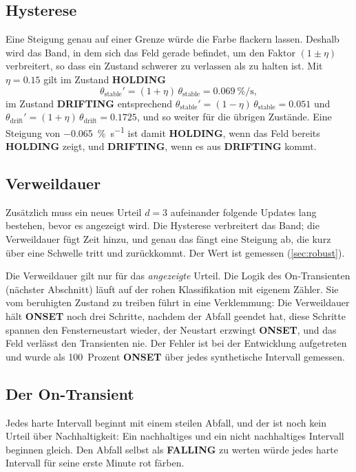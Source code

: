 \documentclass[11pt,a4paper]{article}
\newcommand{\st}[2]{\textcolor{#1}{\textbf{#2}}}
\newcommand{\HOLDING}{\st{holding}{HOLDING}}
\newcommand{\DRIFTING}{\st{drifting}{DRIFTING}}
\newcommand{\FALLING}{\st{falling}{FALLING}}
\newcommand{\ONSET}{\st{onset}{ONSET}}
\newcommand{\pers}{\si{\percent\per\second}}
\begin{document}
\subsection{Hysterese}

Eine Steigung genau auf einer Grenze würde die Farbe flackern lassen. Deshalb
wird das Band, in dem sich das Feld gerade befindet, um den Faktor
$(1 \pm \eta)$ verbreitert, so dass ein Zustand schwerer zu verlassen als zu
halten ist. Mit $\eta = \num{0.15}$ gilt im Zustand \HOLDING{}
\begin{equation}
  \theta_{\mathrm{stable}}' = (1+\eta)\,\theta_{\mathrm{stable}} = \num{0.069}~\pers,
\end{equation}
im Zustand \DRIFTING{} entsprechend
$\theta_{\mathrm{stable}}' = (1-\eta)\,\theta_{\mathrm{stable}} = \num{0.051}$
und $\theta_{\mathrm{drift}}' = (1+\eta)\,\theta_{\mathrm{drift}} = \num{0.1725}$,
und so weiter für die übrigen Zustände. Eine Steigung von
\num{-0.065}~\pers{} ist damit \HOLDING{}, wenn das Feld bereits \HOLDING{}
zeigt, und \DRIFTING{}, wenn es aus \DRIFTING{} kommt.

\subsection{Verweildauer}

Zusätzlich muss ein neues Urteil $d = 3$ aufeinander folgende Updates lang
bestehen, bevor es angezeigt wird. Die Hysterese verbreitert das Band; die
Verweildauer fügt Zeit hinzu, und genau das fängt eine Steigung ab, die kurz
über eine Schwelle tritt und zurückkommt. Der Wert ist gemessen
(\cref{sec:robust}).

Die Verweildauer gilt nur für das \emph{angezeigte} Urteil. Die Logik des
On-Transienten (nächster Abschnitt) läuft auf der rohen Klassifikation mit
eigenem Zähler. Sie vom beruhigten Zustand zu treiben führt in eine
Verklemmung: Die Verweildauer hält \ONSET{} noch drei Schritte, nachdem der
Abfall geendet hat, diese Schritte spannen den Fensterneustart wieder, der
Neustart erzwingt \ONSET{}, und das Feld verlässt den Transienten nie. Der
Fehler ist bei der Entwicklung aufgetreten und wurde als 100~Prozent \ONSET{}
über jedes synthetische Intervall gemessen.

\subsection{Der On-Transient}
\label{sec:onset}

Jedes harte Intervall beginnt mit einem steilen Abfall, und der ist noch kein
Urteil über Nachhaltigkeit: Ein nachhaltiges und ein nicht nachhaltiges
Intervall beginnen gleich. Den Abfall selbst als \FALLING{} zu werten würde
jedes harte Intervall für seine erste Minute rot färben.
\end{document}
